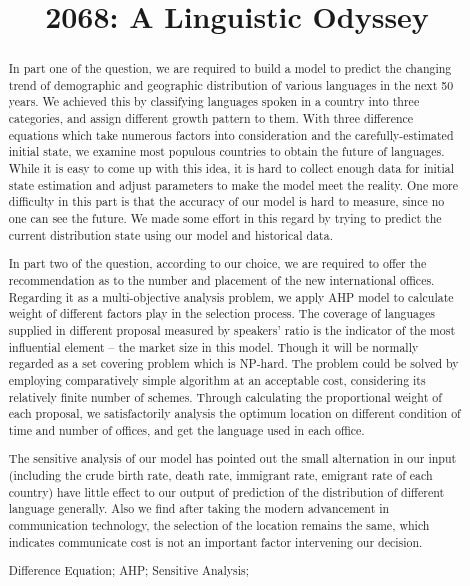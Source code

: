 \documentclass{mcmthesis}
\title{2068: A Linguistic Odyssey}
\begin{document}
\begin{abstract}
In part one of the question, we are required to build a model to predict the changing trend of demographic and geographic distribution of various languages in the next 50 years. We achieved this by classifying languages spoken in a country into three categories, and assign different growth pattern to them. With three difference equations which take numerous factors into consideration and the carefully-estimated initial state, we examine most populous countries to obtain the future of languages. While it is easy to come up with this idea, it is hard to collect enough data for initial state estimation and adjust parameters to make the model meet the reality. One more difficulty in this part is that the accuracy of our model is hard to measure, since no one can see the future. We made some effort in this regard by trying to predict the current distribution state using our model and historical data.

In part two of the question, according to our choice, we are required to offer the recommendation as to the number and placement of the new international offices. Regarding it as a multi-objective analysis problem, we apply AHP model to calculate weight of different factors play in the selection process. The coverage of languages supplied in different proposal measured by speakers' ratio is the indicator of the most influential element -- the market size in this model. Though it will be normally regarded as a set covering problem which is NP-hard. The problem could be solved by employing comparatively simple algorithm at an acceptable cost, considering its relatively finite number of schemes. Through calculating the proportional weight of each proposal, we satisfactorily analysis the optimum location on different condition of time and number of offices, and get the language used in each office.

The sensitive analysis of our model has pointed out the small alternation in our input (including the crude birth rate, death rate, immigrant rate, emigrant rate of each country) have little effect to our output of prediction of the distribution of different language generally. Also we find after taking the modern advancement in communication technology, the selection of the location remains the same, which indicates communicate cost is not an important factor intervening our decision.

\begin{keywords}
Difference Equation; AHP; Sensitive Analysis;
\end{keywords}
\end{abstract}
\maketitle
\tableofcontents
\newpage
\end{document}
